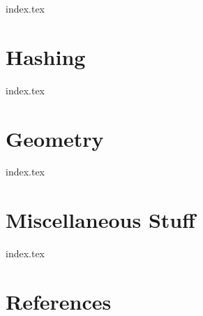\documentclass{article}
\begin{document}
{index.tex}

\newpage

\section{Hashing}

{index.tex}

\newpage

\section{Geometry}

{index.tex}

\newpage

\section{Miscellaneous Stuff}

{index.tex}

\newpage
\section{References}


\end{document}
